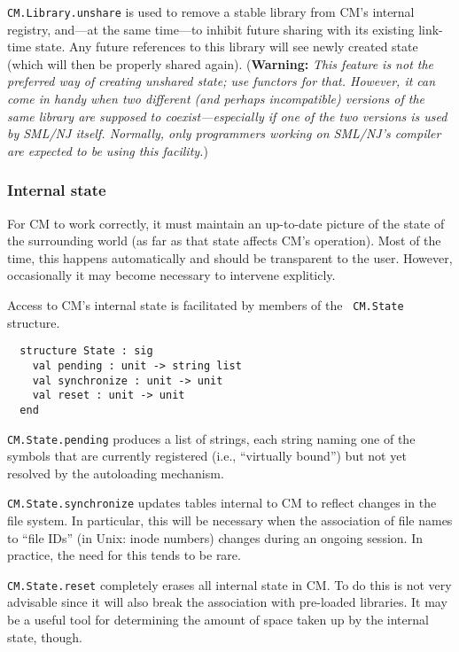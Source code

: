 \documentclass[titlepage,letterpaper]{article}
\begin{document}
{\tt CM.Library.unshare} is used to remove a stable library from CM's
internal registry, and---at the same time---to inhibit future sharing
with its existing link-time state.  Any future references to this
library will see newly created state (which will then be properly
shared again).  ({\bf Warning:} {\it This feature is not the preferred
way of creating unshared state; use functors for that.  However, it
can come in handy when two different (and perhaps incompatible)
versions of the same library are supposed to coexist---especially if
one of the two versions is used by SML/NJ itself.  Normally, only
programmers working on SML/NJ's compiler are expected to be using this
facility.})

\subsubsection{Internal state}

For CM to work correctly, it must maintain an up-to-date picture of
the state of the surrounding world (as far as that state affects CM's
operation).  Most of the time, this happens automatically and should be
transparent to the user.  However, occasionally it may become
necessary to intervene expliticly.

Access to CM's internal state is facilitated by members of the {\tt
CM.State} structure.

\begin{verbatim}
  structure State : sig
    val pending : unit -> string list
    val synchronize : unit -> unit
    val reset : unit -> unit
  end
\end{verbatim}

{\tt CM.State.pending} produces a list of strings, each string naming
one of the symbols that are currently registered (i.e., ``virtually
bound'') but not yet resolved by the autoloading mechanism.

{\tt CM.State.synchronize} updates tables internal to CM to reflect
changes in the file system.  In particular, this will be necessary
when the association of file names to ``file IDs'' (in Unix: inode
numbers) changes during an ongoing session.  In practice, the need for
this tends to be rare.

{\tt CM.State.reset} completely erases all internal state in CM.  To
do this is not very advisable since it will also break the association
with pre-loaded libraries.  It may be a useful tool for determining
the amount of space taken up by the internal state, though.
\end{document}
